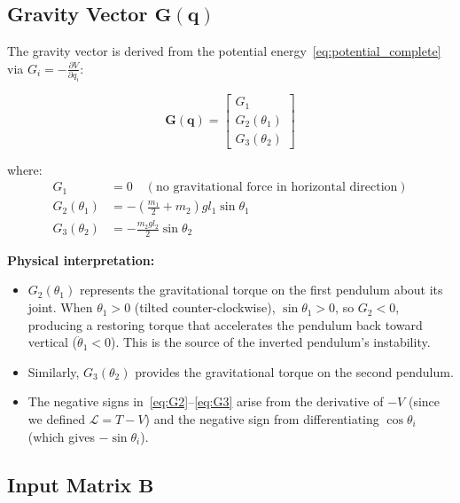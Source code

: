 \subsection{Gravity Vector $\mathbf{G}(\mathbf{q})$}

The gravity vector is derived from the potential energy~\eqref{eq:potential_complete} via $G_i = -\frac{\partial V}{\partial q_i}$:

\begin{equation}
\mathbf{G}(\mathbf{q}) = \begin{bmatrix} G_1 \\ G_2(\theta_1) \\ G_3(\theta_2) \end{bmatrix}
\label{eq:gravity_vector}
\end{equation}

where:
\begin{align}
G_1 &= 0 \quad (\text{no gravitational force in horizontal direction}) \label{eq:G1} \\
G_2(\theta_1) &= -\left( \frac{m_1}{2} + m_2 \right) g l_1 \sin\theta_1 \label{eq:G2} \\
G_3(\theta_2) &= -\frac{m_2 g l_2}{2} \sin\theta_2 \label{eq:G3}
\end{align}

\textbf{Physical interpretation:}
\begin{itemize}
\item $G_2(\theta_1)$ represents the gravitational torque on the first pendulum about its joint. When $\theta_1 > 0$ (tilted counter-clockwise), $\sin\theta_1 > 0$, so $G_2 < 0$, producing a restoring torque that accelerates the pendulum back toward vertical ($\ddot{\theta}_1 < 0$). This is the source of the inverted pendulum's instability.

\item Similarly, $G_3(\theta_2)$ provides the gravitational torque on the second pendulum.

\item The negative signs in~\eqref{eq:G2}--\eqref{eq:G3} arise from the derivative of $-V$ (since we defined $\mathcal{L} = T - V$) and the negative sign from differentiating $\cos\theta_i$ (which gives $-\sin\theta_i$).
\end{itemize}

\subsection{Input Matrix $\mathbf{B}$}

